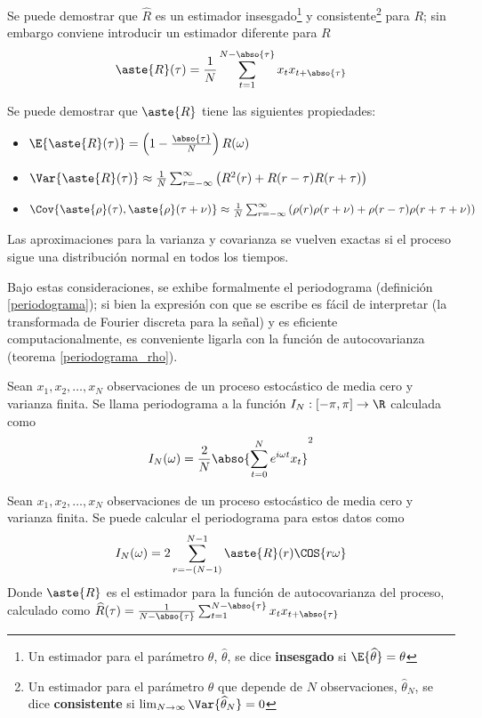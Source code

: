 Se puede demostrar que $\widehat{R}$ es un estimador insesgado\footnote{Un estimador para el 
par\'ametro $\theta$, $\widehat{\theta}$, se dice \textbf{insesgado} si 
$\E{\widehat{\theta}}=\theta$} y consistente\footnote{Un estimador para el par\'ametro $\theta$ que 
depende de $N$ observaciones, 
$\widehat{\theta}_N$, se dice \textbf{consistente} si 
$\lim_{N\rightarrow \infty} \Var{\widehat{\theta}_N} = 0$} 
para $R$; sin embargo conviene introducir un estimador diferente para $R$
\begin{equation*}
\aste{R}(\tau) = \frac{1}{N} 
\sum_{t = 1}^{N-\abso{\tau}} x_t x_{t+\abso{\tau}}
\label{estimador_R_ast}
\end{equation*}

Se puede demostrar que $\aste{R}$ tiene las siguientes propiedades:
\begin{itemize}
\item $\E{\aste{R}(\tau)} = \left(1 - \frac{\abso{\tau}}{N} \right) R(\omega)$
\item $\Var{\aste{R}(\tau)} \approx \frac{1}{N} 
\sum_{r=-\infty}^{\infty} \left( R^{2}(r) + R(r-\tau)R(r+\tau) \right)$
\item $\Cov{\aste{\rho}(\tau),\aste{\rho}(\tau+\nu)} \approx \frac{1}{N} 
\sum_{r=-\infty}^{\infty} \left( \rho(r)\rho(r+\nu) + \rho(r-\tau)\rho(r+\tau+\nu) \right)$
\end{itemize}
Las aproximaciones para la varianza y covarianza se vuelven exactas si el proceso sigue una 
distribuci\'on normal en todos los tiempos.

Bajo estas consideraciones, se exhibe formalmente el periodograma (definici\'on 
\ref{periodograma}); si bien la expresi\'on con que se escribe es f\'acil de interpretar (la 
transformada de Fourier discreta para la se\~nal) y es eficiente computacionalmente, es conveniente
ligarla con la funci\'on de autocovarianza (teorema \ref{periodograma_rho}).

\begin{defn}[Periodograma]
Sean $x_1, x_2 , \dots, x_N$ observaciones de un proceso estoc\'astico de media cero y varianza
finita. Se llama periodograma a la funci\'on $I_N: [-\pi,\pi] \rightarrow \R$ calculada como
\begin{equation*}
I_N(\omega) = \frac{2}{N} \abso{ \sum_{t=0}^{N} e^{i \omega t} x_t }^{2}
\end{equation*}
\label{periodograma}
\end{defn}

\begin{thrm}
Sean $x_1, x_2 , \dots, x_N$ observaciones de un proceso estoc\'astico de media cero y varianza
finita. Se puede calcular el periodograma para estos datos como
\begin{equation*}
I_N(\omega) = 2 \sum_{r = -(N-1)}^{N-1} \aste{R}(r) \COS{r \omega}
\end{equation*}
Donde $\aste{R}$ es el estimador para la funci\'on de autocovarianza del proceso, calculado como
$\widehat{R}(\tau) = \frac{1}{N-\abso{\tau}} \sum_{t = 1}^{N-\abso{\tau}} x_t x_{t+\abso{\tau}}$
\label{periodograma_rho}
\end{thrm}


